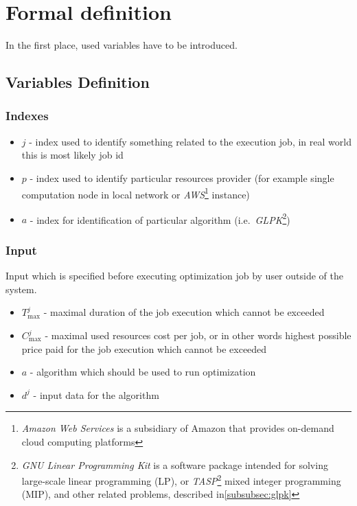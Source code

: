 
\section{Formal definition}\label{sec:formal-definition}
In the first place, used variables have to be introduced.

\subsection{Variables Definition}\label{subsec:variables-definition}

\subsubsection{Indexes}
\begin{itemize}
    \item $j$ - index used to identify something related to the execution job, in real world this is most likely job id
    \item $p$ - index used to identify particular resources provider (for example single computation node in local network
    or \textit{AWS}\footnote{\textit{Amazon Web Services} is a subsidiary of Amazon that provides on-demand cloud computing platforms} instance)
    \item $a$ - index for identification of particular algorithm (i.e.\
    \textit{GLPK}\footnote{\textit{GNU Linear Programming Kit} is a software package intended for solving large-scale linear programming (LP),
    or \textit{TASP}\footnote{\textit{Task and Asset Scheduling Platform} - proprietary optimization software developed by Blindspot Solutions, described in\ref{subsubsec:tasp}}
    mixed integer programming (MIP), and other related problems, described in\ref{subsubsec:glpk}})
\end{itemize}

\subsubsection{Input}
Input which is specified before executing optimization job by user outside of the system.

\begin{itemize}
    \item $T_{\max}^{j}$ - maximal duration of the job execution which cannot be exceeded
    \item $C_{\max}^{j}$ - maximal used resources cost per job, or in other words highest possible price paid for the job execution which cannot be exceeded
    \item $a$ - algorithm which should be used to run optimization
    \item $d^{j}$ - input data for the algorithm
\end{itemize}

